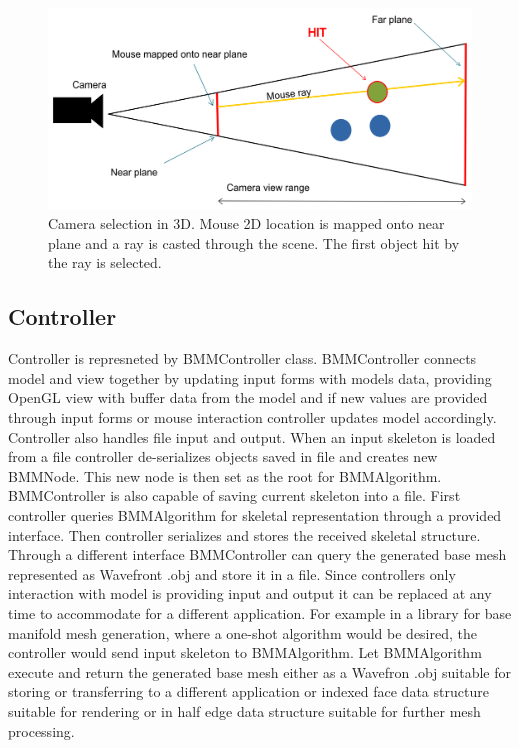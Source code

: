 \begin{figure}[h]
    \centering
    \includegraphics[width=\textwidth]{images/camera_selection}
    \caption[Camera selection]{Camera selection in 3D. Mouse 2D location is mapped onto near plane and a ray is casted through the scene. The first object hit by the ray is selected.}
    \label{fig:camera_selection}
\end{figure}

\subsection{Controller}

Controller is represneted by BMMController class.
BMMController connects model and view together by updating input forms with models data, providing OpenGL view with buffer data from the model and if new values are provided through input forms or mouse interaction controller updates model accordingly.
Controller also handles file input and output.
When an input skeleton is loaded from a file controller de-serializes objects saved in file and creates new BMMNode.
This new node is then set as the root for BMMAlgorithm.
BMMController is also capable of saving current skeleton into a file.
First controller queries BMMAlgorithm for skeletal representation through a provided interface.
Then controller serializes and stores the received skeletal structure.
Through a different interface BMMController can query the generated base mesh represented as Wavefront .obj and store it in a file.
Since controllers only interaction with model is providing input and output it can be replaced at any time to accommodate for a different application.
For example in a library for base manifold mesh generation, where a one-shot algorithm would be desired, the controller would  send input skeleton to BMMAlgorithm.
Let BMMAlgorithm execute and return the generated base mesh either as a Wavefron .obj suitable for storing or transferring to a different application or indexed face data structure suitable for rendering or in half edge data structure suitable for further mesh processing.

